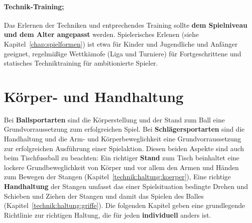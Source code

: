 \paragraph{Technik-Training;} 
Das Erlernen der Techniken und entprechendes Training sollte \textbf{dem Spielniveau und dem Alter angepasst} werden. 
Spielerisches Erlenen (siehe Kapitel~\ref{chap:spielformen}) ist etwa für Kinder und Jugendliche und Anfänger geeignet, regelmäßige Wettkämofe (Liga und Turniere) für Fortgeschrittene und statisches Techniktraining für ambitionierte Spieler.


\section{Körper- und Handhaltung}
\label{technik:haltung}

Bei \textbf{Ballsportarten} sind die Körperstellung und der Stand zum Ball eine Grundvorraussetzung zum erfolgreichen Spiel.
Bei \textbf{Schlägersportarten} sind die Handhaltung und die Arm- und Körperbeweglichkeit eine Grundvorraussetzung zur erfolgreichen Ausführung einer Spielaktion.
Diesen beiden Aspekte sind auch beim Tischfussball zu beachten:
Ein richtiger \textbf{Stand} zum Tisch beinhaltet eine lockere Grundbeweglichkeit von Körper und vor allem den Armen und Händen zum Bewegen der Stangen (Kapitel~\ref{technik:haltung:koerper}),
Eine richtige \textbf{Handhaltung} der Stangen umfasst das einer Spielsituation bedingte Drehen und Schieben und Ziehen der Stangen und damit das Spielen des Balles (Kapitel~\ref{technik:haltung:griffe}).
Die folgenden Kapitel geben eine grundlegende Richtlinie zur richtigen Haltung, die für jeden \textbf{individuell} anders ist. 

